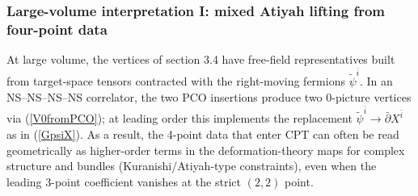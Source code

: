\documentclass[12pt]{article}
\newcommand{\wt}[1]{\widetilde{#1}}
\begin{document}
		\subsubsection{Large-volume interpretation I: mixed Atiyah lifting from four-point data}
		
		At large volume, the vertices of section 3.4 have free-field representatives built from target-space tensors contracted with the right-moving fermions $\wt\psi^{\bar i}$. In an NS--NS--NS--NS correlator, the two PCO insertions produce two 0-picture vertices via (\ref{V0fromPCO}); at leading order this implements the replacement $\wt\psi^{\bar i}\to \bar\partial X^{\bar i}$ as in (\ref{GpsiX}). As a result, the 4-point data that enter CPT can often be read geometrically as higher-order terms in the deformation-theory maps for complex structure and bundles (Kuranishi/Atiyah-type constraints), even when the leading 3-point coefficient vanishes at the strict $(2,2)$ point.
		
\end{document}
